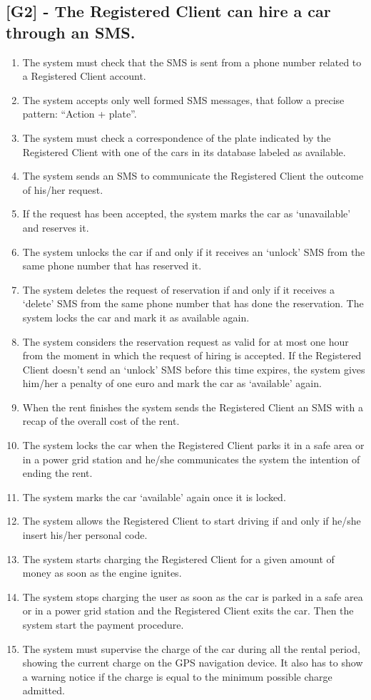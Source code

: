 \subsection{[G2] - The Registered Client can hire a car through an SMS.}
\begin{enumerate}[label=R2.\arabic*]
\item The system must check that the SMS is sent from a phone number related to a Registered Client account.
\item The system accepts only well formed SMS messages, that follow a precise pattern: “Action + plate”.
\item The system must check a correspondence of the plate indicated by the Registered Client with one of the cars in its database labeled as available.
\item The system sends an SMS to communicate the Registered Client the outcome of his/her request.
\item If the request has been accepted, the system marks the car as ‘unavailable’ and reserves it.
\item The system unlocks the car if and only if it receives an ‘unlock’ SMS from  the same phone number that has reserved it.
\item The system deletes the request of reservation if and only if it receives a ‘delete’ SMS from the same phone number that has done the reservation. The system locks the car and mark it as available again.
\item The system considers the reservation request as valid for at most one hour from the moment in which the request of hiring is accepted. If the Registered Client doesn’t send an ‘unlock’ SMS before this time expires, the system gives him/her a penalty of one euro and mark the car as ‘available’ again.
\item When the rent finishes the system sends the Registered Client an SMS with a recap of the overall cost of the rent.
\item The system locks the car when the Registered Client parks it in a safe area or in a power grid station and he/she communicates the system the intention of ending the rent.
\item The system marks the car ‘available’ again once it is locked.
\item The system allows the Registered Client to start driving if and only if he/she insert his/her personal code.
\item The system starts charging the Registered Client for a given amount of money as soon as the engine ignites.
\item The system stops charging the user as soon as the car is parked in a safe area or in a power grid station and the Registered Client exits the car. Then the system start the payment procedure.
\item The system must supervise the charge of the car during all the rental period, showing the current charge on the GPS navigation device. It also has to show a warning notice if the charge is equal to the minimum possible charge admitted.
\end{enumerate}

